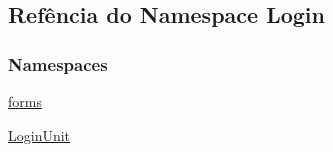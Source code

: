 \hypertarget{namespaceLogin}{\subsection{Refência do Namespace Login}
\label{namespaceLogin}
}
\subsubsection*{Namespaces}
\begin{DoxyCompactItemize}
\item 
\hyperlink{namespaceLogin_1_1forms}{forms}
\item 
\hyperlink{namespaceLogin_1_1LoginUnit}{Login\-Unit}
\end{DoxyCompactItemize}
